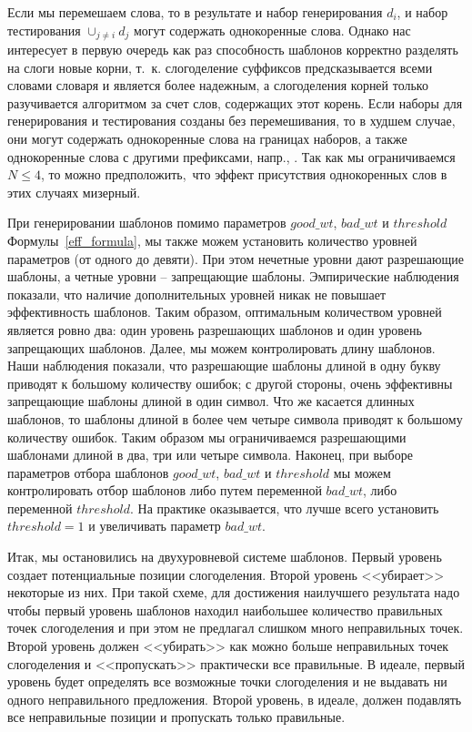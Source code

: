 \documentclass[12pt,a4paper,oneside]{extarticle}
\begin{document}
\noindent Если мы перемешаем слова, то в результате и набор генерирования $d_i$, и набор тестирования $\cup_{j \neq i} d_j$ могут содержать 
однокоренные слова. Однако нас интересует в первую очередь как раз способность шаблонов корректно разделять на слоги новые корни, т.~к. 
слогоделение суффиксов предсказывается всеми словами словаря и является более надежным, а слогоделения корней только разучивается алгоритмом 
за счет слов, содержащих этот корень. Если наборы для генерирования и тестирования созданы без перемешивания, то в худшем случае, они могут 
содержать однокоренные слова на границах наборов, а также однокоренные слова с другими префиксами, напр., 
. Так как мы ограничиваемся $N \leq 4$, то можно предположить, что эффект присутствия однокоренных 
слов в этих случаях мизерный.

При генерировании шаблонов помимо параметров $good\_wt$, $bad\_wt$ и $threshold$ Формулы~\ref{eff_formula}, мы также можем установить 
количество уровней параметров (от одного до девяти). При этом нечетные уровни дают разрешающие шаблоны, а четные уровни -- запрещающие 
шаблоны. Эмпирические наблюдения показали, что наличие дополнительных уровней никак не повышает эффективность шаблонов. Таким образом, 
оптимальным количеством уровней является ровно два: один уровень разрешающих шаблонов и один уровень запрещающих шаблонов. Далее, мы можем 
контролировать длину шаблонов. Наши наблюдения показали, что разрешающие шаблоны длиной в одну букву приводят к большому количеству ошибок; 
с другой стороны, очень эффективны запрещающие шаблоны длиной в один символ. Что же касается длинных шаблонов, то шаблоны длиной в более 
чем четыре символа приводят к большому количеству ошибок. Таким образом мы ограничиваемся разрешающими шаблонами длиной в два, три или четыре 
символа. Наконец, при выборе параметров отбора шаблонов $good\_wt$, $bad\_wt$ и $threshold$ мы можем 
контролировать отбор шаблонов либо путем переменной $bad\_wt$, либо переменной $threshold$. На практике оказывается, что лучше всего 
установить $threshold = 1$ и увеличивать параметр $bad\_wt$.

Итак, мы остановились на двухуровневой системе шаблонов. Первый уровень создает потенциальные позиции слогоделения. Второй уровень
<<убирает>> некоторые из них. При такой схеме, для достижения наилучшего результата надо чтобы первый уровень шаблонов
находил наибольшее количество правильных точек слогоделения и при этом не предлагал слишком много неправильных точек. Второй уровень
должен <<убирать>> как можно больше неправильных точек слогоделения и <<пропускать>> практически все правильные. В идеале, первый
уровень будет определять все возможные точки слогоделения и не выдавать ни одного неправильного предложения. Второй уровень, в идеале,
должен подавлять все неправильные позиции и пропускать только правильные. 
\end{document}

